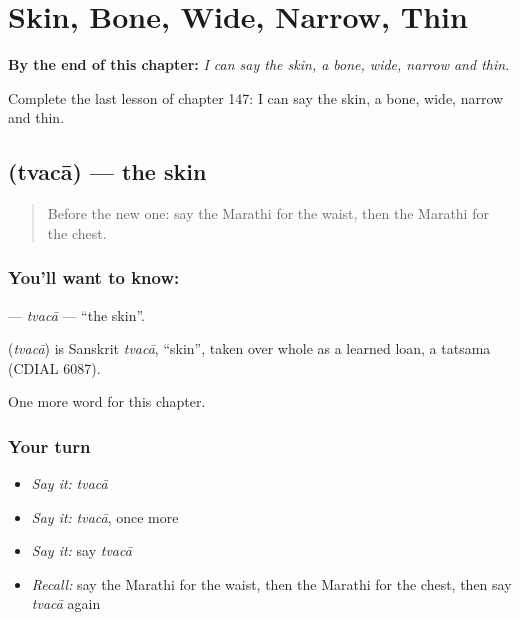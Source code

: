 
\chapter{Skin, Bone, Wide, Narrow, Thin}
\label{ch:mr-skin-bone-wide-narrow-thin}

\begin{chapteropening}
\textbf{By the end of this chapter:} \emph{I can say the skin, a bone, wide, narrow and thin.}

Complete the last lesson of chapter 147: I can say the skin, a bone, wide, narrow and thin.
\end{chapteropening}

\section[\texorpdfstring{\mr{त्वचा} (tvacā)}{त्वचा (tvacā)}]{ (tvacā) — the skin}

\label{lesson:MR-C147-tvaca}



\begin{quote}
Before the new one: say the Marathi for the waist, then the Marathi for the chest.
\end{quote}

\subsection*{You'll want to know: }
\textbf{} — \emph{tvacā} — \textquotedblleft{}the skin\textquotedblright{}.

\begin{cousinweb}
\textbf{} (\emph{tvacā}) is Sanskrit \emph{tvacā}, \textquotedblleft{}skin\textquotedblright{}, taken over whole as a learned loan, a tatsama (CDIAL 6087).
\end{cousinweb}

\begin{grammarlens}[title={What you've built}]
One more word for this chapter.
\end{grammarlens}

\subsection*{Your turn}
\begin{itemize}
\raggedright
  \item \emph{Say it:} \emph{tvacā}
  \item \emph{Say it:} \emph{tvacā}, once more
  \item \emph{Say it:} say \emph{tvacā}
  \item \emph{Recall:} say the Marathi for the waist, then the Marathi for the chest, then say \emph{tvacā} again
\end{itemize}

